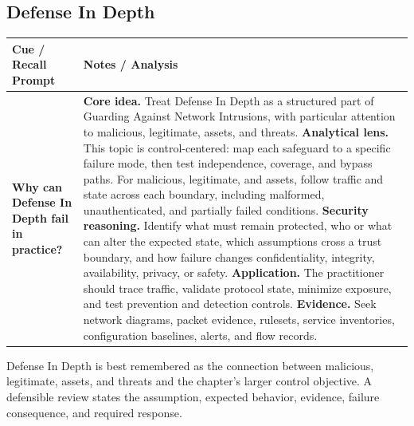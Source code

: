 \documentclass[11pt]{article}
\newcommand{\CornellHeader}{%
\rowcolor{Navy}\color{white}\bfseries Cue / Recall Prompt & \color{white}\bfseries Notes / Analysis\\\hline}
\newcommand{\CornellRow}[2]{%
\cellcolor{CueGray}\RaggedRight\textbf{#1} & \RaggedRight #2\\\hline}
\begin{document}
\subsection*{Defense In Depth}
\begin{longtable}{>{\RaggedRight\arraybackslash}p{}|>{\RaggedRight\arraybackslash}p{}}
\CornellHeader
\CornellRow{Why can Defense In Depth fail in practice?}{\textbf{Core idea.} Treat Defense In Depth as a structured part of Guarding Against Network Intrusions, with particular attention to malicious, legitimate, assets, and threats. \textbf{Analytical lens.} This topic is control-centered: map each safeguard to a specific failure mode, then test independence, coverage, and bypass paths. For malicious, legitimate, and assets, follow traffic and state across each boundary, including malformed, unauthenticated, and partially failed conditions. \textbf{Security reasoning.} Identify what must remain protected, who or what can alter the expected state, which assumptions cross a trust boundary, and how failure changes confidentiality, integrity, availability, privacy, or safety. \textbf{Application.} The practitioner should trace traffic, validate protocol state, minimize exposure, and test prevention and detection controls. \textbf{Evidence.} Seek network diagrams, packet evidence, rulesets, service inventories, configuration baselines, alerts, and flow records.}
\end{longtable}
\begin{topicsummary}
Defense In Depth is best remembered as the connection between malicious, legitimate, assets, and threats and the chapter's larger control objective. A defensible review states the assumption, expected behavior, evidence, failure consequence, and required response.
\end{topicsummary}
\end{document}

